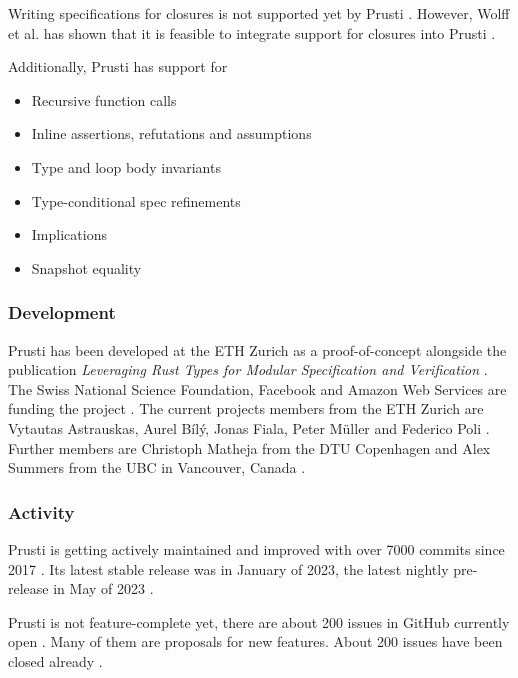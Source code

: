 Writing specifications for closures is not supported yet by Prusti \cite{prusti_user_guide_closures_2023}. However, Wolff et al. has shown that it is feasible to integrate support for closures into Prusti \cite{wolff_modular_2021}.

Additionally, Prusti has support for
\begin{itemize}
    \item Recursive function calls \cite{deshmukh_prusti_2022}
    \item Inline assertions, refutations and assumptions \cite{prusti_user_guide_assertions_2023}
    \item Type and loop body invariants \cite{deshmukh_prusti_2022}
    \item Type-conditional spec refinements \cite{prusti_user_guide_type-conditional_2023}
    \item Implications \cite{prusti_user_guide_specification_2023}
    \item Snapshot equality \cite{prusti_user_guide_specification_2023}
\end{itemize}

\subsubsection{Development}
Prusti has been developed at the ETH Zurich as a proof-of-concept alongside the publication \textit{Leveraging Rust Types for Modular Specification and Verification} \cite{astrauskas_leveraging_2019}. The Swiss National Science Foundation, Facebook and Amazon Web Services are funding the project \cite{eth_zurich_prusti_2023}. The current projects members from the ETH Zurich are Vytautas Astrauskas, Aurel Bílý, Jonas Fiala, Peter Müller and Federico Poli \cite{eth_zurich_prusti_2023}. Further members are Christoph Matheja from the DTU Copenhagen and Alex Summers from the UBC in Vancouver, Canada \cite{eth_zurich_prusti_2023}.

\subsubsection{Activity}
Prusti is getting actively maintained and improved with over 7000 commits since 2017 \cite{eth_zurich_viperprojectprusti-dev_2023}. Its latest stable release was in January of 2023, the latest nightly pre-release in May of 2023 \cite{eth_zurich_releases_2023}. 

Prusti is not feature-complete yet, there are about 200 issues in GitHub currently open \cite{eth_zurich_issues_2023}. Many of them are proposals for new features. About 200 issues have been closed already \cite{eth_zurich_issues_2023}.

